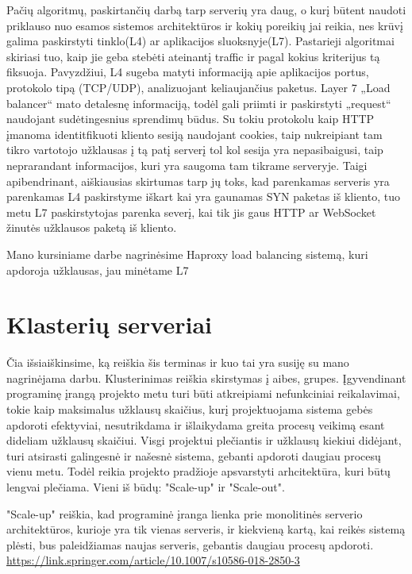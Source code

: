 \documentclass{VUMIFPSkursinis}
\begin{document}
	Pačių algoritmų, paskirtančių darbą tarp serverių yra daug, o kurį būtent naudoti priklauso nuo esamos sistemos architektūros ir kokių poreikių jai reikia, nes krūvį galima paskirstyti tinklo(L4) ar aplikacijos sluoksnyje(L7). Pastarieji algoritmai skiriasi tuo, kaip jie geba stebėti ateinantį traffic ir pagal kokius kriterijus tą fiksuoja. Pavyzdžiui, L4 sugeba matyti informaciją apie aplikacijos portus, protokolo tipą (TCP/UDP), analizuojant keliaujančius paketus. Layer 7 „Load balancer“ mato detalesnę informaciją, todėl gali priimti ir paskirstyti „request“ naudojant sudėtingesnius sprendimų būdus. Su tokiu protokolu kaip HTTP įmanoma identitfikuoti kliento sesiją naudojant cookies, taip nukreipiant tam tikro vartotojo užklausas į tą patį serverį tol kol sesija yra nepasibaigusi, taip neprarandant informacijos, kuri yra saugoma tam tikrame serveryje. Taigi apibendrinant, aiškiausias skirtumas tarp jų toks, kad parenkamas serveris yra parenkamas L4 paskirstyme iškart kai yra gaunamas SYN paketas\cite{MsSyn} iš kliento, tuo metu L7 paskirstytojas parenka severį, kai tik jis gaus HTTP ar WebSocket žinutės užklausos paketą iš kliento.
 
Mano kursiniame darbe nagrinėsime Haproxy load balancing sistemą, kuri apdoroja užklausas, jau minėtame L7

\section{Klasterių serveriai}
	Čia išsiaiškinsime, ką reiškia šis terminas ir kuo tai yra susiję su mano nagrinėjama darbu. Klusterinimas reiškia skirstymas į aibes, grupes. Įgyvendinant programinę įrangą projekto metu turi būti atkreipiami nefunkciniai reikalavimai, tokie kaip maksimalus užklausų skaičius, kurį projektuojama sistema gebės apdoroti efektyviai, nesutrikdama ir išlaikydama greita procesų veikimą esant dideliam užklausų skaičiui. Visgi projektui plečiantis ir užklausų kiekiui didėjant, turi atsirasti galingesnė ir našesnė sistema, gebanti apdoroti daugiau procesų vienu metu. Todėl reikia projekto pradžioje apsvarstyti arhcitektūra, kuri būtų lengvai plečiama. Vieni iš būdų: "Scale-up" ir "Scale-out".

"Scale-up" reiškia, kad programinė įranga lienka prie monolitinės serverio architektūros, kurioje yra tik vienas serveris, ir kiekvieną kartą, kai reikės sistemą plėsti, bus paleidžiamas naujas serveris, gebantis daugiau procesų apdoroti.
\url {https://link.springer.com/article/10.1007/s10586-018-2850-3}
\end{document}
